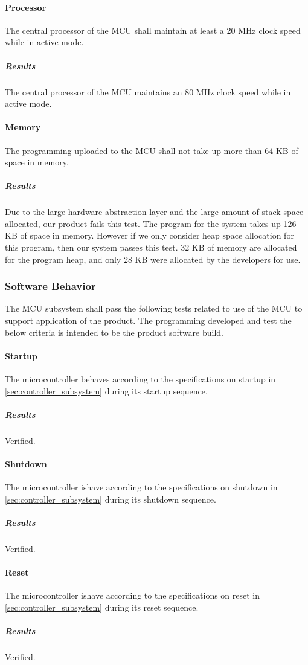 \paragraph{Processor} The central processor of the MCU shall maintain at
least a 20 MHz clock speed while in active mode.
\subparagraph{Results} The central processor of the MCU maintains an 80 MHz clock speed while in active mode.

\paragraph{Memory} The programming uploaded to the MCU shall not take up
more than 64 KB of space in memory.
\subparagraph{Results} Due to the large hardware abstraction layer and the large amount of stack space allocated, our product fails this test. The program for the system takes up 126 KB of space in memory. However if we only consider heap space allocation for this program, then our system passes this test. 32 KB of memory are allocated for the program heap, and only 28 KB were allocated by the developers for use.

\subsubsection{Software Behavior} The MCU subsystem shall pass the following
tests related to use of the MCU to support application of the product. The
programming developed and test the below criteria is intended to be the
product software build.

\paragraph{Startup} The microcontroller behaves according to the specifications on startup in \autoref{sec:controller_subsystem} during its startup sequence.
\subparagraph{Results} Verified.

\paragraph{Shutdown} The microcontroller ishave according to the specifications on shutdown in \autoref{sec:controller_subsystem} during its shutdown sequence.
\subparagraph{Results} Verified.

\paragraph{Reset} The microcontroller ishave according to the specifications on reset in \autoref{sec:controller_subsystem} during its reset sequence.
\subparagraph{Results} Verified.

